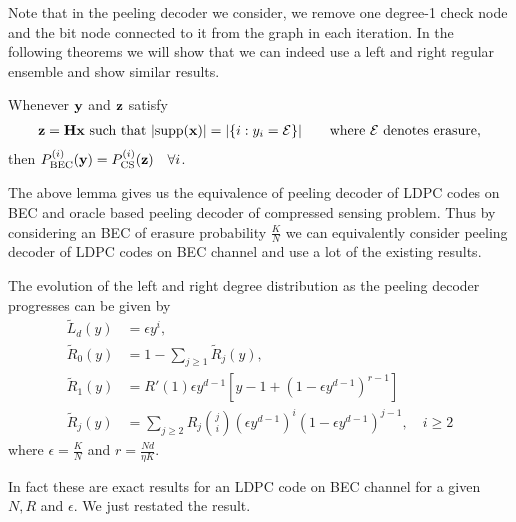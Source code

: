 \documentclass[journal,draft,onecolumn]{IEEEtran}
\begin{document}
Note that in the peeling decoder we consider, we remove one degree-1 check node and the bit node connected to it from the graph in each iteration. In the following theorems we will show that we can indeed use a left and right regular ensemble and show similar results. %

\begin{lemma}
Whenever $\mathbf{y}$ and $\mathbf{z}$ satisfy
\begin{align*}
\mathbf{z=Hx} \text{ such that  } |\text{supp}(\mathbf{x})|=|\{i:y_i=\mathcal{E}\}| \qquad \text{where } \mathcal{E} \text{ denotes erasure},
\end{align*}
then $P_{\text{BEC}}^{(i)}(\mathbf{y})=P_{\text{CS}}^{(i)}(\mathbf{z}) \quad \forall i$.
\end{lemma}

The above lemma gives us the equivalence of peeling decoder of LDPC codes on BEC and oracle based peeling decoder of compressed sensing problem. Thus by considering an BEC of erasure probability $\frac{K}{N}$ we can equivalently consider peeling decoder of LDPC codes on BEC channel and use a lot of the existing results.

\begin{lemma}
\label{lem:RightDegEvolution}
The evolution of the left and right degree distribution as the peeling decoder progresses can be given by
\begin{align*}
\tilde{L}_d(y)&=\epsilon y^i,\\
\tilde{R}_{0}(y)&=1-\sum_{j\geq 1}\tilde{R}_{j}(y),\\
\tilde{R}_{1}(y)&=R'(1)\epsilon y^{d-1}[y-1+ (1-\epsilon y^{d-1})^{r-1}]\\
\tilde{R}_{j}(y)&=\sum_{j\geq 2}R_{j}\binom{j}{i}(\epsilon y^{d-1})^i (1-\epsilon y^{d-1})^{j-1}, \quad i\geq 2
\end{align*}
where $\epsilon=\frac{K}{N}$ and $r=\frac{Nd}{\eta K}$.
\end{lemma}
\begin{IEEEproof}
In fact these are exact results for an LDPC code on BEC channel for a given $N,R$ and $\epsilon$. We just restated the result.
\end{IEEEproof}
\end{document}
